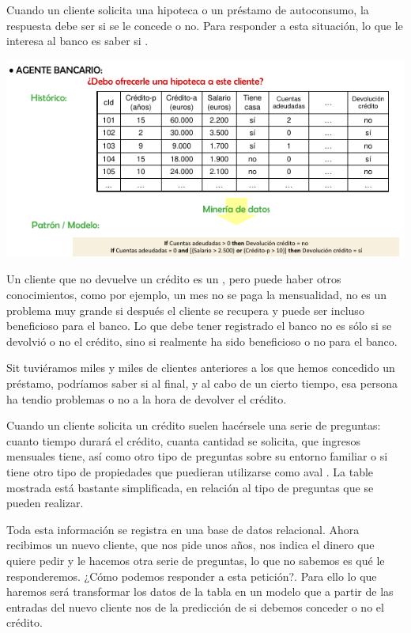 Cuando un cliente solicita una hipoteca o un préstamo de autoconsumo, la respuesta debe ser si se le concede o no. Para responder a esta situación, lo que le interesa al banco es saber si .

\begin{center}
    \includegraphics[scale=.8]{images/mod01-03.png}
\end{center}

Un cliente que no devuelve un crédito es un , pero puede haber otros conocimientos, como por ejemplo, un mes no se paga la mensualidad, no es un problema muy grande si después el cliente se recupera y puede ser incluso beneficioso para el banco. Lo que debe tener registrado el banco no es sólo si se devolvió o no el crédito, sino si realmente ha sido beneficioso o no para el banco.

Sit tuviéramos miles y miles de clientes anteriores a los que hemos concedido un préstamo, podríamos saber si al final, y al cabo de un cierto tiempo, esa persona ha tendio problemas o no a la hora de devolver el crédito.

Cuando un cliente solicita un crédito suelen hacérsele una serie de preguntas: cuanto tiempo durará el crédito, cuanta cantidad se solicita, que ingresos mensuales tiene, así como otro tipo de preguntas sobre su entorno familiar o si tiene otro tipo de propiedades que puedieran utilizarse como aval . La table mostrada está bastante simplificada, en relación al tipo de preguntas que se pueden realizar.

Toda esta información se registra en una base de datos relacional. Ahora recibimos un nuevo cliente, que nos pide unos años, nos indica el dinero que quiere pedir y le hacemos otra serie de preguntas, lo que no sabemos es qué le responderemos. ¿Cómo podemos responder a esta petición?. Para ello lo que haremos será transformar los datos de la tabla en un modelo que a partir de las entradas del nuevo cliente nos de la predicción de si debemos conceder o no el crédito.

